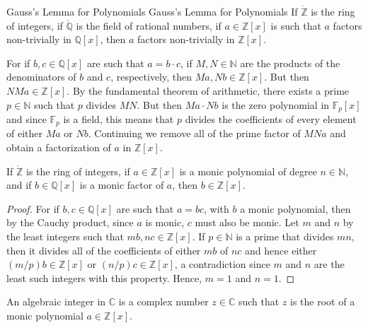     \begin{ftheorem}{Gauss's Lemma for Polynomials}
                    {Gauss's Lemma for Polynomials}
        If $\ring{\mathbb{Z}}$ is the ring of integers, if
        $\ring{\mathbb{Q}}$ is the field of rational numbers, if
        $a\in{\mathbb{Z}}[x]$ is such that $a$ factors non-trivially in
        $\mathbb{Q}[x]$, then $a$ factors non-trivially in $\mathbb{Z}[x]$.
    \end{ftheorem}
    \begin{bproof}
        For if $b,c\in\mathbb{Q}[x]$ are such that $a=b\cdot{c}$, if
        $M,N\in\mathbb{N}$ are the products of the denominators of $b$
        and $c$, respectively, then $Ma,Nb\in\mathbb{Z}[x]$. But then
        $NMa\in\mathbb{Z}[x]$. By the fundamental theorem of arithmetic,
        there exists a prime $p\in\mathbb{N}$ such that $p$ divides $MN$.
        But then $Ma\cdot{N}b$ is the zero polynomial in $\mathbb{F}_{p}[x]$
        and since $\mathbb{F}_{p}$ is a field, this means that $p$ divides
        the coefficients of every element of either $Ma$ or $Nb$. Continuing
        we remove all of the prime factor of $MNa$ and obtain a
        factorization of $a$ in $\mathbb{Z}[x]$.
    \end{bproof}
    \begin{theorem}
        If $\ring{\mathbb{Z}}$ is the ring of integers, if
        $a\in\mathbb{Z}[x]$ is a monic polynomial of degree
        $n\in\mathbb{N}$, and if $b\in\mathbb{Q}[x]$ is a monic factor of
        $a$, then $b\in\mathbb{Z}[x]$.
    \end{theorem}
    \begin{proof}
        For if $b,c\in\mathbb{Q}[x]$ are such that $a=bc$, with $b$ a monic
        polynomial, then by the Cauchy product, since $a$ is monic, $c$
        must also be monic. Let $m$ and $n$ by the least integers such that
        $mb,nc\in\mathbb{Z}[x]$. If $p\in\mathbb{N}$ is a prime that divides
        $mn$, then it divides all of the coefficients of either $mb$ of $nc$
        and hence either $(m/p)b\in\mathbb{Z}[x]$ or
        $(n/p)c\in\mathbb{Z}[x]$, a contradiction since $m$ and $n$ are the
        least such integers with this property. Hence, $m=1$ and $n=1$.
    \end{proof}
    \begin{definition}
        An algebraic integer in $\mathbb{C}$ is a complex number
        $z\in\mathbb{C}$ such that $z$ is the root of a monic polynomial
        $a\in\mathbb{Z}[x]$.
    \end{definition}
